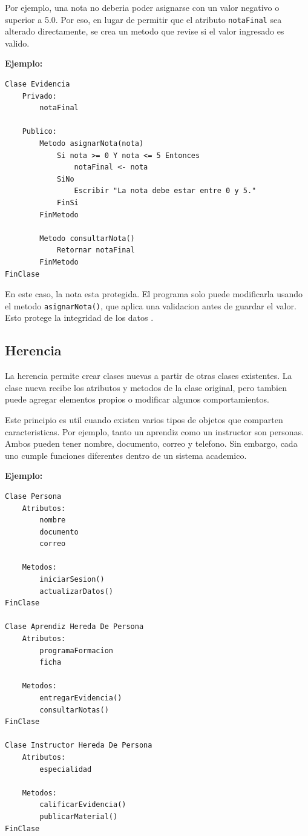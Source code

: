 \documentclass[12pt,letterpaper]{article}
\begin{document}
Por ejemplo, una nota no deberia poder asignarse con un valor negativo o superior a 5.0. Por eso, en lugar de permitir que el atributo \texttt{notaFinal} sea alterado directamente, se crea un metodo que revise si el valor ingresado es valido.

\textbf{Ejemplo:}

\begin{lstlisting}
Clase Evidencia
    Privado:
        notaFinal

    Publico:
        Metodo asignarNota(nota)
            Si nota >= 0 Y nota <= 5 Entonces
                notaFinal <- nota
            SiNo
                Escribir "La nota debe estar entre 0 y 5."
            FinSi
        FinMetodo

        Metodo consultarNota()
            Retornar notaFinal
        FinMetodo
FinClase
\end{lstlisting}

En este caso, la nota esta protegida. El programa solo puede modificarla usando el metodo \texttt{asignarNota()}, que aplica una validacion antes de guardar el valor. Esto protege la integridad de los datos \parencite{microsoftOOP}.

\subsection{Herencia}

La herencia permite crear clases nuevas a partir de otras clases existentes. La clase nueva recibe los atributos y metodos de la clase original, pero tambien puede agregar elementos propios o modificar algunos comportamientos.

Este principio es util cuando existen varios tipos de objetos que comparten caracteristicas. Por ejemplo, tanto un aprendiz como un instructor son personas. Ambos pueden tener nombre, documento, correo y telefono. Sin embargo, cada uno cumple funciones diferentes dentro de un sistema academico.

\textbf{Ejemplo:}

\begin{lstlisting}
Clase Persona
    Atributos:
        nombre
        documento
        correo

    Metodos:
        iniciarSesion()
        actualizarDatos()
FinClase

Clase Aprendiz Hereda De Persona
    Atributos:
        programaFormacion
        ficha

    Metodos:
        entregarEvidencia()
        consultarNotas()
FinClase

Clase Instructor Hereda De Persona
    Atributos:
        especialidad

    Metodos:
        calificarEvidencia()
        publicarMaterial()
FinClase
\end{lstlisting}
\end{document}
